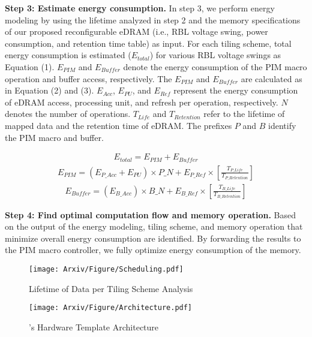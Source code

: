 \textbf{Step 3: Estimate energy consumption.} In step 3, we perform energy modeling by using the lifetime analyzed in step 2 and the memory specifications of our proposed reconfigurable eDRAM (i.e., RBL voltage swing, power consumption, and retention time table) as input. For each tiling scheme, total energy consumption is estimated ($E_{total}$) for various RBL voltage swings as Equation (1). $E_{PIM}$ and $E_{Buffer}$ denote the energy consumption of the PIM macro operation and buffer access, respectively. The $E_{PIM}$ and $E_{Buffer}$ are calculated as in Equation (2) and (3). $E_{Acc}$, $E_{PU}$, and $E_{Ref}$ represent the energy consumption of eDRAM access, processing unit, and refresh per operation, respectively. $N$ denotes the number of operations. $T_{Life}$ and $T_{Retention}$ refer to the lifetime of mapped data and the retention time of eDRAM. The prefixes $P$ and $B$ identify the PIM macro and buffer.

\begin{scriptsize}
\begin{align}
    E_{total} = E_{PIM}+E_{Buffer}
\end{align}
\begin{align}
    E_{PIM} = (E_{P\_Acc}+E_{PU}) \times P\_N + E_{P\_Ref} \times \left[\frac{T_{P\_Life}}{T_{P\_Retention}}\right]
\end{align}
\begin{align}
    E_{Buffer} = (E_{B\_Acc}) \times B\_N + E_{B\_Ref} \times \left[\frac{T_{B\_Life}}{T_{B\_Retention}}\right]
\end{align}
\end{scriptsize}

\textbf{Step 4: Find optimal computation flow and memory operation.} Based on the output of the energy modeling, tiling scheme, and memory operation that minimize overall energy consumption are identified. By forwarding the results to the PIM macro controller, we fully optimize energy consumption of the memory.

\begin{figure}[t]
\centering
\texttt{[image: Arxiv/Figure/Scheduling.pdf]}
\caption{Lifetime of Data per Tiling Scheme Analysis}
\vspace{-0.1in}
\label{figure9}
\end{figure}


\begin{figure*}[t]
\centering
\texttt{[image: Arxiv/Figure/Architecture.pdf]}
\caption{\sysname's Hardware Template Architecture}
\label{figure6}
\end{figure*}


